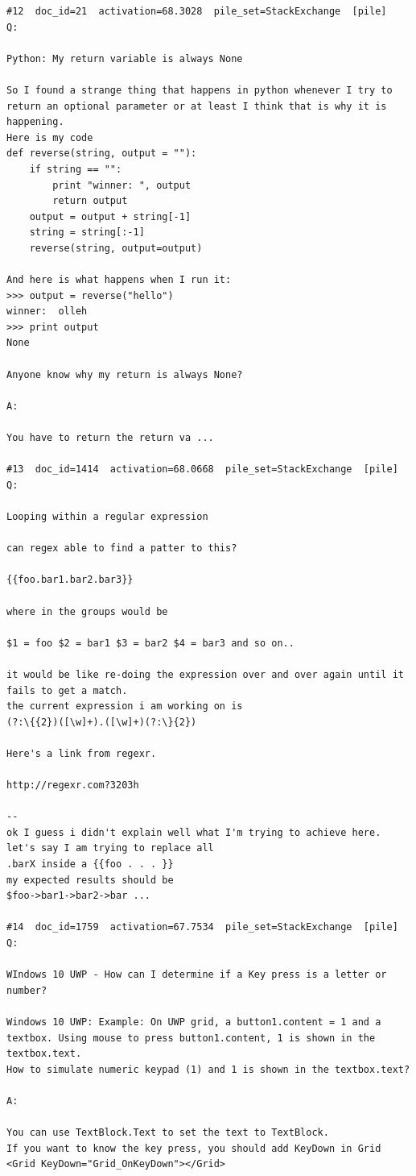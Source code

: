 \begin{verbatim}
#12  doc_id=21  activation=68.3028  pile_set=StackExchange  [pile]
Q:

Python: My return variable is always None

So I found a strange thing that happens in python whenever I try to return an optional parameter or at least I think that is why it is happening.
Here is my code
def reverse(string, output = ""):
    if string == "":
        print "winner: ", output
        return output
    output = output + string[-1]
    string = string[:-1]
    reverse(string, output=output)

And here is what happens when I run it:
>>> output = reverse("hello")
winner:  olleh
>>> print output
None

Anyone know why my return is always None?

A:

You have to return the return va ...

#13  doc_id=1414  activation=68.0668  pile_set=StackExchange  [pile]
Q:

Looping within a regular expression

can regex able to find a patter to this?

{{foo.bar1.bar2.bar3}}

where in the groups would be

$1 = foo $2 = bar1 $3 = bar2 $4 = bar3 and so on..

it would be like re-doing the expression over and over again until it fails to get a match.
the current expression i am working on is
(?:\{{2})([\w]+).([\w]+)(?:\}{2})

Here's a link from regexr.

http://regexr.com?3203h

--
ok I guess i didn't explain well what I'm trying to achieve here. 
let's say I am trying to replace all 
.barX inside a {{foo . . . }}
my expected results should be
$foo->bar1->bar2->bar ...

#14  doc_id=1759  activation=67.7534  pile_set=StackExchange  [pile]
Q:

WIndows 10 UWP - How can I determine if a Key press is a letter or number?

Windows 10 UWP: Example: On UWP grid, a button1.content = 1 and a textbox. Using mouse to press button1.content, 1 is shown in the textbox.text.
How to simulate numeric keypad (1) and 1 is shown in the textbox.text?

A:

You can use TextBlock.Text to set the text to TextBlock.
If you want to know the key press, you should add KeyDown in Grid
<Grid KeyDown="Grid_OnKeyDown"></Grid>


\end{verbatim}
